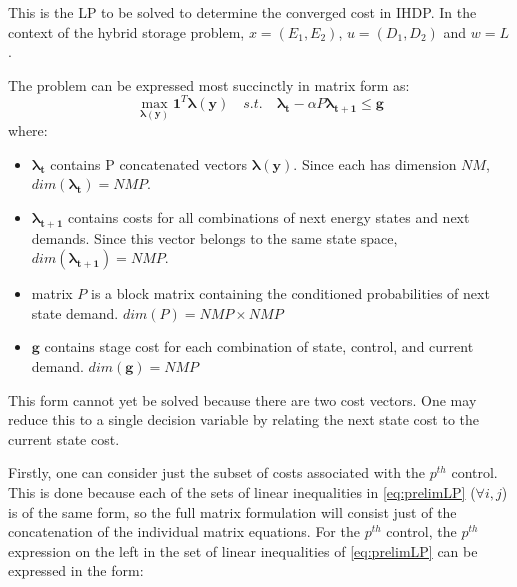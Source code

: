 \documentclass[conference]{IEEEtran}
\begin{document}
This is the LP to be solved to determine the converged cost in IHDP. In the context of the hybrid storage problem, $x=(E_{1},E_{2})$, $u=(D_{1},D_{2})$ and $w=L$.

The problem can be expressed most succinctly in matrix form as:
\begin{equation} \label{eq:prelimLPmtx}
    \max_{\boldsymbol{\lambda(y)}} \boldsymbol{1}^{T} \boldsymbol{\lambda(y)}
    \hspace{1em}s.t.\hspace{1em}
    \boldsymbol{\lambda_{t}}-\alpha P\boldsymbol{\lambda_{t+1}} \leq \boldsymbol{g}
\end{equation} where:

\begin{itemize}
	\item $\boldsymbol{\lambda_{t}}$ contains P concatenated vectors $\boldsymbol{\lambda(y)}$. Since each has dimension $NM$, $dim(\boldsymbol{\lambda_{t}})=NMP$.
	
	\item $\boldsymbol{\lambda_{t+1}}$ contains costs for all combinations of next energy states and next demands. Since this vector belongs to the same state space, $dim(\boldsymbol{\lambda_{t+1}})=NMP$.
	
	\item matrix $P$ is a block  matrix containing the conditioned probabilities of next state demand. $dim(P)=NMP\times NMP$
	
	\item $\boldsymbol{g}$ contains stage cost for each combination of state, control, and current demand. $dim(\boldsymbol{g})=NMP$
	
\end{itemize}

This form cannot yet be solved because there are two cost vectors. One may reduce this to a single decision variable by relating the next state cost to the current state cost.

Firstly, one can consider just the subset of costs associated with the $p^{th}$ control. This is done because each of the sets of linear inequalities in \eqref{eq:prelimLP} ($\forall i,j$) is of the same form, so the full matrix formulation will consist just of the concatenation of the individual matrix equations. For the $p^{th}$ control, the $p^{th}$ expression on the left in the set of linear inequalities of \eqref{eq:prelimLP} can be expressed in the form:
\end{document}
